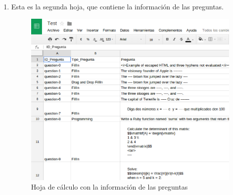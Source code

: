 \begin{enumerate}
  \item Esta es la segunda hoja, que contiene la informaci\'on de las preguntas.
  \begin{figure}[!th]
  \begin{center}
  \includegraphics[width=1.1\textwidth]{images/app12.eps}
  \caption{Hoja de c\'alculo con la informaci\'on de las preguntas}
  \label{fig:app12}
  \end{center}
  \end{figure}
  \newpage


\end{enumerate}
